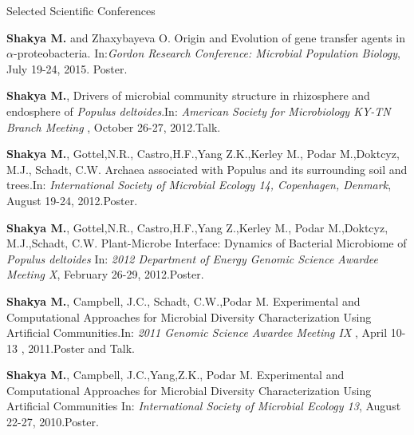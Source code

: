 \documentclass{resume} %
\begin{document}
\begin{rSection}{Selected Scientific Conferences}
\item \textbf{Shakya M.} and Zhaxybayeva O. Origin and Evolution of gene transfer agents in $\alpha$-proteobacteria. In:\emph{Gordon Research Conference: Microbial Population Biology}, July 19-24, 2015. Poster.

\item \textbf{Shakya M.}, Drivers of microbial community structure in rhizosphere and endosphere of \textit{Populus deltoides}.In: \emph{American Society for Microbiology KY-TN Branch Meeting }, October 26-27, 2012.Talk.

\item  \textbf{Shakya M.}, Gottel,N.R., Castro,H.F.,Yang Z.K.,Kerley M., Podar M.,Doktcyz, M.J., Schadt, C.W. Archaea associated with Populus and its surrounding soil and trees.In: \emph{International Society of Microbial Ecology 14, Copenhagen, Denmark}, August 19-24, 2012.Poster.

\item \textbf{Shakya M.}, Gottel,N.R., Castro,H.F.,Yang Z.,Kerley M., Podar M.,Doktcyz, M.J.,Schadt, C.W. Plant-Microbe Interface: Dynamics of Bacterial Microbiome of \textit{Populus deltoides}  In: \emph{2012 Department of Energy Genomic Science Awardee Meeting X}, February 26-29, 2012.Poster.

\item \textbf{Shakya M.}, Campbell, J.C., Schadt, C.W.,Podar M. Experimental and Computational Approaches for Microbial Diversity Characterization Using Artificial Communities.In: \emph{2011 Genomic Science Awardee Meeting IX }, April 10-13 , 2011.Poster and Talk.

\item \textbf{Shakya M.}, Campbell, J.C.,Yang,Z.K., Podar M. Experimental and Computational Approaches for Microbial Diversity Characterization Using Artificial Communities In: \emph{International Society of Microbial Ecology 13}, August 22-27, 2010.Poster.

\end{rSection}
\newpage
\end{document}

